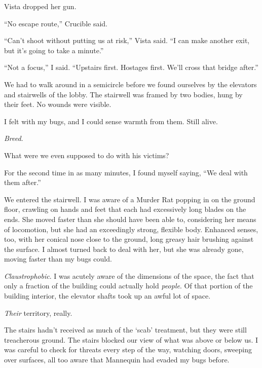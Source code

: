 Vista dropped her gun.



``No escape route,'' Crucible said.



``Can't shoot without putting us at risk,'' Vista said.  ``I can make another exit, but it's going to take a minute.''



``Not a focus,'' I said.  ``Upstairs first.  Hostages first.  We'll cross that bridge after.''



We had to walk around in a semicircle before we found ourselves by the elevators and stairwells of the lobby.  The stairwell was framed by two bodies, hung by their feet.  No wounds were visible.



I felt with my bugs, and I could sense warmth from them.  Still alive.



\emph{Breed}.



What were we even supposed to do with his victims?



For the second time in as many minutes, I found myself saying, ``We deal with them after.''



We entered the stairwell.  I was aware of a Murder Rat popping in on the ground floor, crawling on hands and feet that each had excessively long blades on the ends.  She moved faster than she should have been able to, considering her means of locomotion, but she had an exceedingly strong, flexible body.  Enhanced senses, too, with her conical nose close to the ground, long greasy hair brushing against the surface.  I almost turned back to deal with her, but she was already gone, moving faster than my bugs could.



\emph{Claustrophobic}.  I was acutely aware of the dimensions of the space, the fact that only a fraction of the building could actually hold \emph{people}.  Of that portion of the building interior, the elevator shafts took up an awful lot of space.



\emph{Their} territory, really.



The stairs hadn't received as much of the `scab' treatment, but they were still treacherous ground.  The stairs blocked our view of what was above or below us.  I was careful to check for threats every step of the way, watching doors, sweeping over surfaces, all too aware that Mannequin had evaded my bugs before.



